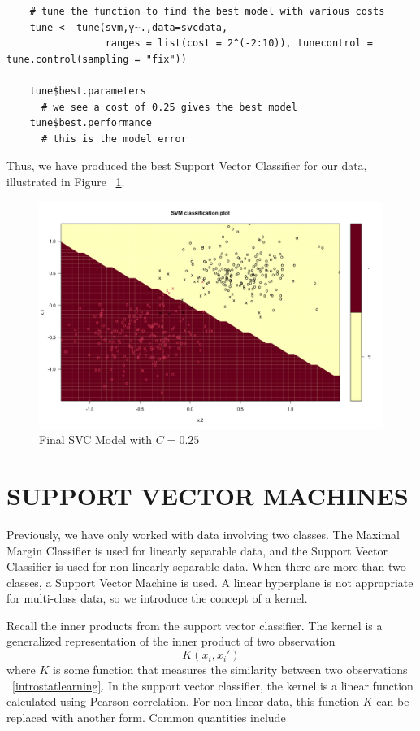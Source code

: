 \documentclass[12pt]{article}
\begin{document}
\begin{verbatim}
    # tune the function to find the best model with various costs
    tune <- tune(svm,y~.,data=svcdata, 
                 ranges = list(cost = 2^(-2:10)), tunecontrol = tune.control(sampling = "fix"))
    
    tune$best.parameters
      # we see a cost of 0.25 gives the best model
    tune$best.performance
      # this is the model error
\end{verbatim}

Thus, we have produced the best Support Vector Classifier for our data, illustrated in Figure ~\ref{fig_svc_final_model}.

\begin{figure}[ht]
    \centering
    \includegraphics[width=5in]{Figures/svc_final_model.png}
    \caption{Final SVC Model with \(C = 0.25\)}
    \label{fig_svc_final_model}
\end{figure}

\section{SUPPORT VECTOR MACHINES}

Previously, we have only worked with data involving two classes. The Maximal Margin Classifier is used for linearly separable data, and the Support Vector Classifier is used for non-linearly separable data. When there are more than two classes, a Support Vector Machine is used. A linear hyperplane is not appropriate for multi-class data, so we introduce the concept of a kernel.

Recall the inner products from the support vector classifier. The kernel is a generalized representation of the inner product of two observation \[K(x_i,x_i')\] where \(K\) is some function that measures the similarity between two observations ~\ref{introstatlearning}. In the support vector classifier, the kernel is a linear function calculated using Pearson correlation. For non-linear data, this function \(K\) can be replaced with another form. Common quantities include
\end{document}
